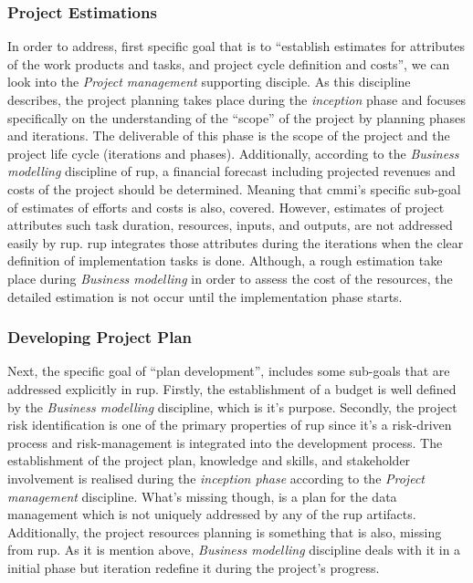 \subsubsection{Project Estimations}
In order to address, first specific goal that is to ``establish estimates for attributes of the work products and tasks, and project cycle definition and costs'', we can look into the \textit{Project management} supporting disciple. As this discipline describes, the project planning takes place during the \textit{inception} phase and focuses specifically on the understanding of the ``scope'' of the project by planning phases and iterations. The deliverable of this phase is the scope of the project and the project life cycle (iterations and phases). Additionally, according to the \textit{Business modelling} discipline of \ac{rup}, a financial forecast including projected revenues and costs of the project should be determined. Meaning that \ac{cmmi}'s specific sub-goal of estimates of efforts and costs is also, covered. However, estimates of project attributes such task duration, resources, inputs, and outputs, are not addressed easily by \ac{rup}. \ac{rup} integrates those attributes during the iterations when the clear definition of implementation tasks is done. Although, a rough estimation take place during \textit{Business modelling} in order to assess the cost of the resources, the detailed estimation is not occur until the implementation phase starts.

\subsubsection{Developing Project Plan}
Next, the specific goal of ``plan development'', includes some sub-goals that are addressed explicitly in \ac{rup}. Firstly, the establishment of a budget is well defined by the \textit{Business modelling} discipline, which is it's purpose. Secondly, the project risk identification is one of the primary properties of \ac{rup} since it's a risk-driven process and risk-management is integrated into the development process. The establishment of the project plan, knowledge and skills, and stakeholder involvement is realised during the \textit{inception phase} according to the \textit{Project management} discipline. What's missing though, is a plan for the data management which is not uniquely addressed by any of the \ac{rup} artifacts. Additionally, the project resources planning is something that is also, missing from \ac{rup}. As it is mention above, \textit{Business modelling} discipline deals with it in a initial phase but iteration redefine it during the project's progress.

